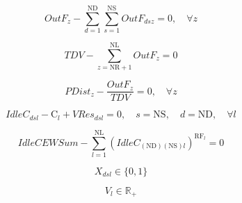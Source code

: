 \documentclass{singlecol}
\theoremstyle{TH}{
\newtheorem{lemma}{Lemma}
\newtheorem{theorem}[lemma]{Theorem}
\newtheorem{corrolary}[lemma]{Corrolary}
\newtheorem{conjecture}[lemma]{Conjecture}
\newtheorem{proposition}[lemma]{Proposition}
\newtheorem{claim}[lemma]{Claim}
\newtheorem{stheorem}[lemma]{Wrong Theorem}
\newtheorem{algorithm}{Algorithm}
}
\theoremstyle{THrm}{
\newtheorem{definition}{Definition}[section]
\newtheorem{question}{Question}[section]
\newtheorem{remark}{Remark}
\newtheorem{scheme}{Scheme}
}
\theoremstyle{THhit}{
\newtheorem{case}{Case}[section]
}
\begin{document}
\begin{equation}
	OutF_{z} - \sum_{d=1}^{\mathrm{ND}}\sum_{s=1}^{\mathrm{NS}}{OutF_{dsz}} = 0, \quad \forall z
	\label{eq:evalTOutFZone}
\end{equation}

\begin{equation}
	TDV - \sum_{z=\mathrm{NR}+1}^{\mathrm{NL}}{OutF_{z}} = 0
	\label{eq:evalTOutF}
\end{equation}

\begin{equation}
	PDist_{z} - \dfrac{OutF_{z}}{TDV} = 0, \quad \forall z
	\label{eq:evalPDist}
\end{equation}

\begin{equation}
	IdleC_{dsl} - \mathrm{C}_{l} + VRes_{dsl} = 0, \quad s = \mathrm{NS}, \quad d = \mathrm{ND}, \quad \forall{l}
	\label{eq:evalIdleCap}
\end{equation}

\begin{equation}
	IdleCEWSum - \sum_{l=1}^{\mathrm{NL}}{ (IdleC_{({\mathrm{ND}})({\mathrm{NS}})l})^{\mathrm{RF}_l }    } = 0
	\label{eq:idleCapEWSum}
\end{equation}

\begin{equation}
	X_{dsl} \in \{0, 1\}
	\label{eq:bv}
\end{equation}

\begin{equation}
	V_{l} \in \mathbb{R}_+
	\label{eq:rv}
\end{equation}
\end{document}
